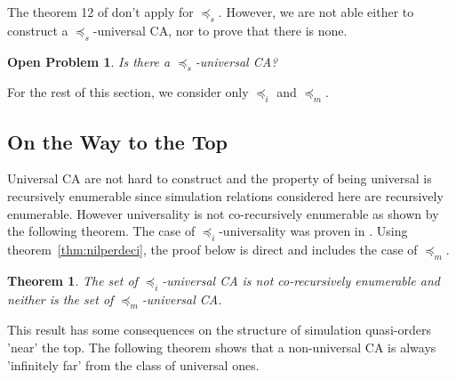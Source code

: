 \documentclass[a4paper]{elsarticle}
\def\qed{\relax\ifmmode\hskip2em \blacksquare\else\unskip\nobreak\hfill\hskip1em $\blacksquare$\fi}
\newcommand{\ACA}{\mathcal{A}}
\newcommand{\simu}{\preccurlyeq}
\newcommand{\sacsimu}{\simu_i}
\newcommand{\facsimu}{\simu_s}
\newcommand{\facsacsimu}{\simu_m}
\newtheorem{thm}{Theorem}[section]
\newtheorem{openpb}{Open Problem}
\begin{document}
The theorem 12 of \cite{bulking1} don't apply for $\facsimu$. However,
we are not able either to construct a $\facsimu$-universal CA, nor to
prove that there is none.

\begin{openpb}
  \label{open:surjuniv}
  Is there a $\facsimu$-universal CA?
\end{openpb}

For the rest of this section, we consider only $\sacsimu$ and
$\facsacsimu$.

\subsection{On the Way to the Top}
\label{sec:reachtop}

Universal CA are not hard to construct and the property of being
universal is recursively enumerable since simulation relations
considered here are recursively enumerable. However universality is
not co-recursively enumerable as shown by the following theorem. The
case of $\sacsimu$-universality was proven in \cite{Ollinger03}. Using
theorem~\ref{thm:nilperdeci}, the proof below is direct and includes
the case of $\facsacsimu$.

\begin{thm}
  \label{thm:indeciuni}
  The set of $\sacsimu$-universal CA is not co-recursively enumerable
  and neither is the set of $\facsacsimu$-universal CA.
\end{thm}

This result has some consequences on the structure of simulation
quasi-orders 'near' the top. The following theorem shows that a
non-universal CA is always 'infinitely far' from the class of
universal ones.
\end{document}
